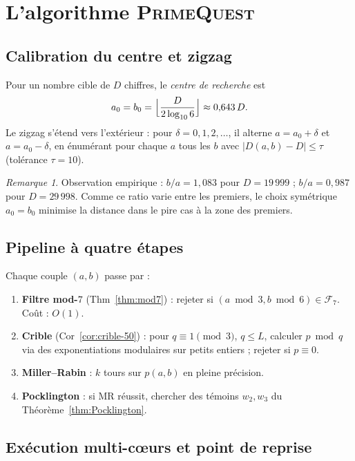 \documentclass[11pt,a4paper]{article}
\theoremstyle{definition}
\theoremstyle{remark}
\newtheorem{remarque}[theoreme]{Remarque}
\newcommand{\F}{\mathcal{F}}
\begin{document}
\section{L'algorithme \textsc{PrimeQuest}}\label{sec:algo}

\subsection{Calibration du centre et zigzag}

Pour un nombre cible de $D$ chiffres, le \emph{centre de recherche} est
\[
  a_0 = b_0 = \Bigl\lfloor\frac{D}{2\log_{10}6}\Bigr\rfloor \approx 0{,}643\,D.
\]
Le zigzag s'étend vers l'extérieur : pour $\delta = 0, 1, 2, \ldots$,
il alterne $a = a_0+\delta$ et $a = a_0-\delta$, en énumérant pour chaque
$a$ tous les $b$ avec $|D(a,b)-D|\leq\tau$ (tolérance $\tau=10$).

\begin{remarque}
Observation empirique : $b/a = 1{,}083$ pour $D=19\,999$ ;
$b/a = 0{,}987$ pour $D=29\,998$. Comme ce ratio varie entre les premiers,
le choix symétrique $a_0=b_0$ minimise la distance dans le pire cas à
la zone des premiers.
\end{remarque}

\subsection{Pipeline à quatre étapes}

Chaque couple $(a,b)$ passe par :
\begin{enumerate}
\item \textbf{Filtre mod-$7$} (Thm~\ref{thm:mod7}) : rejeter si
  $(a\bmod 3,b\bmod 6)\in\F_7$. Coût : $O(1)$.
\item \textbf{Crible} (Cor~\ref{cor:crible-50}) : pour $q\equiv 1\pmod{3}$,
  $q\leq L$, calculer $p\bmod q$ via des exponentiations modulaires
  sur petits entiers ; rejeter si $p\equiv 0$.
\item \textbf{Miller--Rabin} : $k$ tours sur $p(a,b)$ en pleine précision.
\item \textbf{Pocklington} : si MR réussit, chercher des témoins
  $w_2,w_3$ du Théorème~\ref{thm:Pocklington}.
\end{enumerate}

\subsection{Exécution multi-cœurs et point de reprise}
\end{document}
